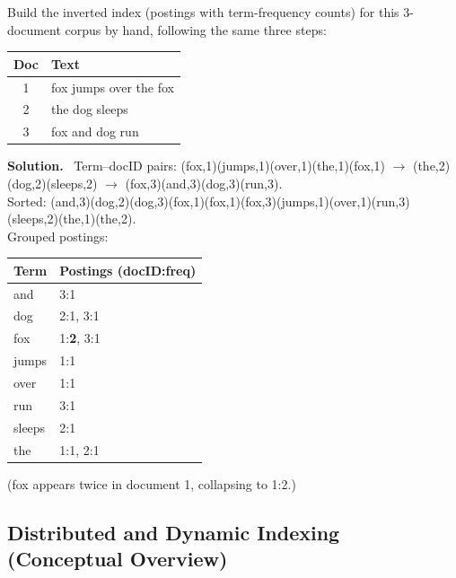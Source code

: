 \documentclass[11pt, a4paper]{article}
\newcommand{\Solution}{\medskip\noindent\textbf{\color{exgreen}Solution.}\ }
\begin{document}
\begin{exercisebox}
Build the inverted index (postings with term-frequency counts) for this 3-document corpus by hand, following the same three steps:
\begin{center}
\begin{tabular}{@{}cl@{}}
\toprule
Doc & Text \\
\midrule
1 & fox jumps over the fox \\
2 & the dog sleeps \\
3 & fox and dog run \\
\bottomrule
\end{tabular}
\end{center}
\end{exercisebox}

\Solution
Term--docID pairs: (fox,1)(jumps,1)(over,1)(the,1)(fox,1) $\to$ (the,2)(dog,2)(sleeps,2) $\to$ (fox,3)(and,3)(dog,3)(run,3).\\
Sorted: (and,3)(dog,2)(dog,3)(fox,1)(fox,1)(fox,3)(jumps,1)(over,1)(run,3)(sleeps,2)(the,1)(the,2).\\
Grouped postings:
\begin{center}
\begin{tabular}{@{}ll@{}}
\toprule
Term & Postings (docID:freq) \\
\midrule
and & 3:1 \\
dog & 2:1, 3:1 \\
fox & 1:\textbf{2}, 3:1 \\
jumps & 1:1 \\
over & 1:1 \\
run & 3:1 \\
sleeps & 2:1 \\
the & 1:1, 2:1 \\
\bottomrule
\end{tabular}
\end{center}
(\textsf{fox} appears twice in document 1, collapsing to \textsf{1:2}.)

\subsection{Distributed and Dynamic Indexing (Conceptual Overview)}
\end{document}
